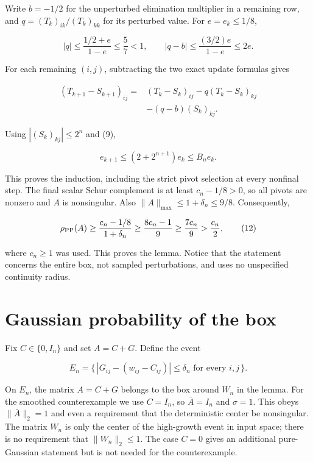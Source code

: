 \documentclass[
  11pt,
  letterpaper,
]{article}
\begin{document}
Write \(b=-1/2\) for the unperturbed elimination multiplier in a
remaining row, and \(q=(T_k)_{ik}/(T_k)_{kk}\) for its perturbed value.
For \(e=e_k\leq1/8\),

\[
|q|\leq\frac{1/2+e}{1-e}\leq\frac57<1,
\qquad
|q-b|\leq\frac{(3/2)e}{1-e}\leq2e.
\tag{9}
\]

For each remaining \((i,j)\), subtracting the two exact update formulas
gives

\[
\begin{aligned}
(T_{k+1}-S_{k+1})_{ij}
={}&(T_k-S_k)_{ij}
-q(T_k-S_k)_{kj}\\
&-(q-b)(S_k)_{kj}.
\end{aligned}
\tag{10}
\]

Using \(|(S_k)_{kj}|\leq2^n\) and (9),

\[
e_{k+1}\leq (2+2^{n+1})e_k\leq B_ne_k.
\tag{11}
\]

This proves the induction, including the strict pivot selection at every
nonfinal step. The final scalar Schur complement is at least
\(c_n-1/8>0\), so all pivots are nonzero and \(A\) is nonsingular. Also
\(\|A\|_{\max}\leq1+\delta_n\leq9/8\). Consequently,

\[
\rho_{\rm PP}(A)\geq\frac{c_n-1/8}{1+\delta_n}
\geq\frac{8c_n-1}{9}\geq\frac{7c_n}{9}>\frac{c_n}{2},
\tag{12}
\]

where \(c_n\geq1\) was used. This proves the lemma. Notice that the
statement concerns the entire box, not sampled perturbations, and uses
no unspecified continuity radius.

\section{Gaussian probability of the
box}\label{gaussian-probability-of-the-box}

Fix \(C\in\{0,I_n\}\) and set \(A=C+G\). Define the event

\[
E_n=\{\,|G_{ij}-(w_{ij}-C_{ij})|\leq\delta_n
\text{ for every }i,j\,\}.
\tag{13}
\]

On \(E_n\), the matrix \(A=C+G\) belongs to the box around \(W_n\) in
the lemma. For the smoothed counterexample we use \(C=I_n\), so
\(\bar A=I_n\) and \(\sigma=1\). This obeys \(\|\bar A\|_2=1\) and even
a requirement that the deterministic center be nonsingular. The matrix
\(W_n\) is only the center of the high-growth event in input space;
there is no requirement that \(\|W_n\|_2\leq1\). The case \(C=0\) gives
an additional pure-Gaussian statement but is not needed for the
counterexample.
\end{document}

